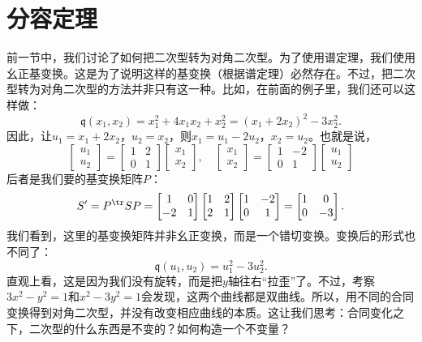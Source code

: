 \documentclass[12pt,UTF8,fontset=none]{ctexbook}
\begin{document}
\section{分容定理}
前一节中，我们讨论了如何把二次型转为对角二次型。为了使用谱定理，我们使用幺正基变换。这是为了说明这样的基变换（根据谱定理）必然存在。不过，把二次型转为对角二次型的方法并非只有这一种。比如，在前面的例子里，我们还可以这样做：
$$ \mathfrak{q}(x_1, x_2) = x_1^2 + 4x_1x_2 + x_2^2 = (x_1 + 2x_2)^2 - 3x_2^2. $$
因此，让$u_1 = x_1+2x_2$，$u_2 = x_2$，则$x_1 = u_1 - 2u_2$，$x_2 = u_2$。也就是说，
$$
\begin{bmatrix}
    u_1 \\ u_2
\end{bmatrix} = 
\begin{bmatrix}
    1 & 2 \\ 0 & 1
\end{bmatrix}
\begin{bmatrix}
    x_1 \\ x_2
\end{bmatrix}, \quad 
\begin{bmatrix}
    x_1 \\ x_2
\end{bmatrix} = 
\begin{bmatrix}
    1 & -2 \\ 0 & 1
\end{bmatrix}
\begin{bmatrix}
    u_1 \\ u_2
\end{bmatrix}
$$
后者是我们要的基变换矩阵$P$：
$$
S' = P^{\tr} S P =
\begin{bmatrix}
    1 & 0 \\ -2 & 1
\end{bmatrix}
\begin{bmatrix}
    1 & 2 \\ 2 & 1
\end{bmatrix}
\begin{bmatrix}
    1 & -2 \\ 0 & 1
\end{bmatrix} = 
\begin{bmatrix}
    1 & 0 \\ 0 & -3
\end{bmatrix}.
$$
我们看到，这里的基变换矩阵并非幺正变换，而是一个错切变换。变换后的形式也不同了：
$$ \mathfrak{q}(u_1, u_2) = u_1^2 -  3u_2^2. $$
直观上看，这是因为我们没有旋转，而是把$y$轴往右“拉歪”了。不过，考察$3x^2 - y^2 = 1$和$x^2 - 3y^2 = 1$会发现，这两个曲线都是双曲线。所以，用不同的合同变换得到对角二次型，并没有改变相应曲线的本质。这让我们思考：合同变化之下，二次型的什么东西是不变的？如何构造一个不变量？
\end{document}
